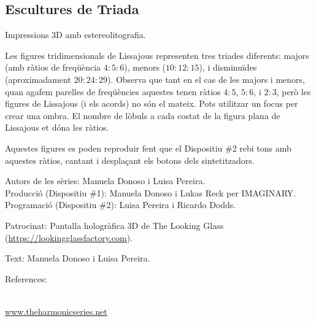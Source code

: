 \subsection{Escultures de Triada}
Impressions 3D amb estereolitografia.

Les figures tridimensionals de Lissajous representen tres triades diferents: majors (amb ràtios de freqüència $4:5:6$), menors ($10:12:15$), i disminuïdes (aproximadament $20:24:29$). Observa que tant en el cas de les majors i menors, quan agafem parelles de freqüències aquestes tenen ràtios $4:5$, $5:6$, i $2:3$, però les figures de Lissajous (i els acords) no són el mateix. Pots utilitzar un focus per crear una ombra. El nombre de lòbuls a cada costat de la figura plana de Lissajous et dóna  les ràtios.

Aquestes figures es poden reproduir fent que el Dispositiu \#2 rebi tons amb aquestes ràtios, cantant i desplaçant els botons dels sintetitzadors.

\begin{sectcredits}

\item[Autors de les sèries:] Manuela Donoso i Luisa Pereira.\\
Producció (Dispositiu \#1): Manuela Donoso i Lukas Reck per IMAGINARY.\\
Programació (Dispositiu \#2): Luisa Pereira i Ricardo Dodds.

\item[Patrocinat:] Pantalla hologràfica 3D de The Looking Glass (\url{https://lookingglassfactory.com}).

\item[Text:] Manuela Donoso i Luisa Pereira.

\item[References:] \strut \\
\url{www.theharmonicseries.net}

\end{sectcredits}
